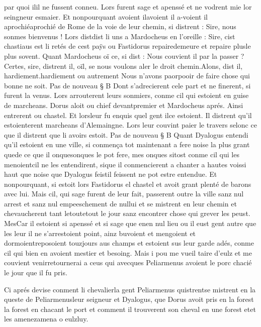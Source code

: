 \documentclass{article}
\begin{document}
\begin{pages}
   par quoi ilil ne fussent conneu. 
   Lors furent sage et apenssé et ne vodrent mie lor seingneur esmaier. Et nonpourquant 
   avoient ilavoient il a-voient il  
   aprochiéaprochié de 
   Rome de la voie de leur chemin, si distrent :
   Sire, nous sonmes bienvenus ! 
   Lors distdist li uns a Mardocheus 
   en l’oreille :
   Sire, cist chastiaus est li retés de cest paÿs 
      ou Fastidorus repairedemeure et repaire 
      plusle plus sovent.
   Quant Mardocheus oï ce, si dist :
   Nous couvient il par la passer ?Certes, sire, distrent il, oïl, 
      se nous voulons aler le droit chemin.Alons, dist il, 
      hardiement.hardiement ou 
         autrement 
      Nous n’avons paorpooir de faire chose qui bonne 
      ne soit. \pend
\pstart Pas de nouveau § B
   Dont s’adrecierent cele part et ne finerent, si furent la venus. Lors arrouterent leurs sonmiers, 
   conme cil qui estoient en guise de marcheans. Dorus aloit ou chief 
   devantpremier et 
   Mardocheus aprés. Ainsi entrerent ou chastel. Et 
   lorsleur fu enquis 
   quel gent ilce 
      estoient. 
   Il distrent qu’il estoienterent 
      marcheans d’Alemaingne. Lors leur couvint paier le travers selonc ce 
   que il distrent que li avoirs estoit. \pend
\pstart Pas de nouveau § B
   Quant Dyalogus entendi qu’il estoient en 
   une ville, 
   si conmença tot maintenant a fere noise 
   la plus grant 
   quede ce que il 
   onquesonques le 
   pot fere, mes onques sitost 
   conme cil qui les menoientcil ne 
   les entendirent, sique il conmencierent a chanter 
   a hautes voissi haut que noise que 
   Dyalogus feistil feissent 
   ne pot estre entendue. 
   Et nonpourquant, si estoit lors Fastidorus el chastel et 
   avoit grant plenté de barons avec lui. Mais cil, qui sage furent de leur fait, passerent outre 
   la ville sanz nul arrest 
   et sanz nul empeeschement de nullui et se mistrent en leur chemin 
   et chevaucherent tant letoutetout le jour sanz encontrer chose qui 
   grever les peust. MesCar il estoient si apenssé et si sage 
   que enen nul lieu ou il 
   eust gent autre que les leur il ne s’arrestoient 
   point, 
   ainz buvoient et mengoient et dormoientreposoient touzjours aus champs 
   et estoient sus leur garde adés, conme cil qui bien en avoient mestier et besoing. 
   Mais i pou me vueil taire d’eulz et 
      me couvient venirretournerai a ceus qui 
   avecques Peliarmenus avoient le porc chacié le jour que il fu pris.
 \pend
         
            Ci aprés devise 
               conment li chevalierla gent Peliarmenus 
               quistrentse mistrent en la queste de 
               Peliarmenusleur seigneur 
               et Dyalogus, que Dorus 
                  avoit pris en la forest
                     la forest en chacant le port
                  et comment il trouverent son cheval en une forest 
               etet les 
               amenezamena o 
                  eulzluy.
            

\end{pages}
\end{document}

